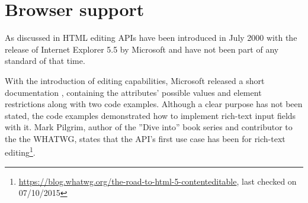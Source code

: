 

\section{Browser support}
\label{sec:edit_apis_browser_support}

As discussed in  HTML editing APIs have been introduced in July 2000 with the release of Internet Explorer 5.5 by Microsoft and have not been part of any standard of that time.


With the introduction of editing capabilities, Microsoft released a short documentation \cite{ac2}, containing the attributes' possible values and element restrictions along with two code examples. Although a clear purpose has not been stated, the code examples demonstrated how to implement rich-text input fields with it. Mark Pilgrim, author of the ''Dive into'' book series and contributor to the the WHATWG, states that the API's first use case has been for rich-text editing\footnote{\url{https://blog.whatwg.org/the-road-to-html-5-contenteditable}, last checked on 07/10/2015}. 





